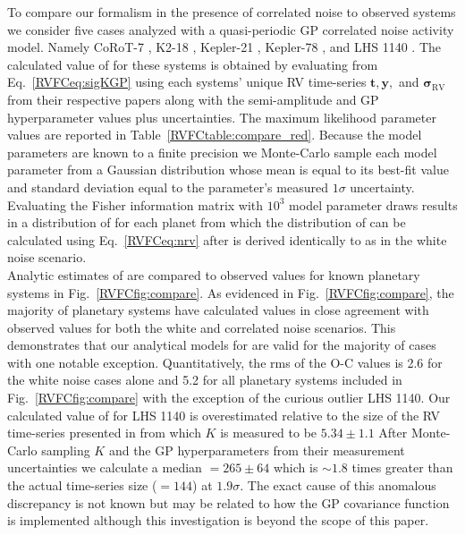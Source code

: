 

To compare our formalism in the presence of correlated noise to observed systems we consider five cases analyzed
with a quasi-periodic GP correlated noise activity model. Namely CoRoT-7 \citep{haywood14},
K2-18 \citep{cloutier17b}, Kepler-21 \citep{lopezmorales16}, Kepler-78 \citep{grunblatt15}, and
LHS 1140 \citep{dittmann17a}. The calculated value of \nrv{} for these systems is obtained by evaluating
\sigK{} from Eq.~\ref{RVFCeq:sigKGP} using each systems' unique RV time-series $\mathbf{t},\mathbf{y},$ and
$\boldsymbol{\sigma}_{\text{RV}}$ from their
respective papers along with the semi-amplitude and GP hyperparameter values plus uncertainties.
The maximum likelihood parameter values are reported in Table~\ref{RVFCtable:compare_red}.
Because the model parameters are known to a finite precision we Monte-Carlo sample each model parameter
from a Gaussian distribution
whose mean is equal to its best-fit value and standard deviation equal to the parameter's measured $1\sigma$
uncertainty. Evaluating the Fisher information matrix with $10^3$ model parameter draws results in a
distribution of \sigK{} for each planet from which the distribution of \nrv{} can be calculated using
Eq.~\ref{RVFCeq:nrv} after \sigeff{} is derived identically to as in the white noise scenario. \\



Analytic estimates of \nrv{} are compared to observed values for known planetary
systems in Fig.~\ref{RVFCfig:compare}. As evidenced in Fig.~\ref{RVFCfig:compare}, the majority of planetary systems
have calculated \nrv{} values in close agreement with observed values for both the white and correlated noise
scenarios. 
This demonstrates that our analytical models for \nrv{} are valid for the majority of cases
with one notable exception. Quantitatively, the rms of the O-C \nrv{} values is 2.6 for the white noise
cases alone and 5.2 for all planetary systems included in Fig.~\ref{RVFCfig:compare} with the exception of
the curious outlier LHS 1140.
Our calculated value of \nrv{} for LHS 1140 is overestimated relative to the
size of the RV time-series presented in \cite{dittmann17a} from which $K$ is measured to be $5.34 \pm 1.1$
 After Monte-Carlo sampling $K$ and the GP hyperparameters from their measurement
uncertainties we calculate a median \nrv{}$=265 \pm 64$ which is $\sim 1.8$ times greater than the actual
time-series size (\nrv{}$=144$) at $1.9\sigma$. The exact cause of this anomalous discrepancy is not known
but may be related to how the GP covariance function is implemented although this investigation is
beyond the scope of this paper.  

